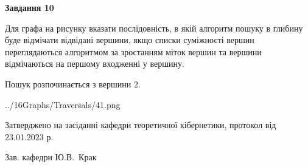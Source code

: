 \documentclass[12pt, ukrainian]{article}
\begin{document}
{\begin {large}
{\begin {center}\textbf{Завдання 10}\end {center}}\par
Для графа на рисунку вказати послідовність, в якій алгоритм пошуку в глибину буде відмічати відвідані вершини, якщо списки суміжності вершин переглядаються алгоритмом за зростанням міток вершин та вершини відмічаються на першому вход\-женні у вершину.\par
Пошук розпочинається з вершини 2.\par

\begin{center}
	{../16Graphs/Traversals/41.png}
\end{center}\par
\newpage


\end {large}
}
{\smallskip \begin {small} Затверджено на засіданні кафедри теоретичної кібернетики, протокол  від   23.01.2023 р.\par\smallskip\smallskip
{\parbox {6.5 cm}{Зав. кафедри \dotfill Ю.В.~Крак}} \end{small}}
\end{document}
